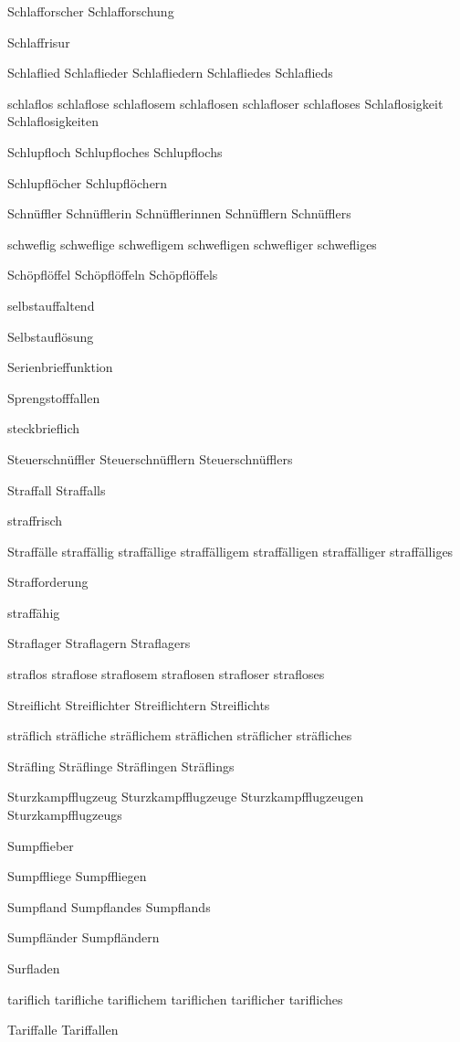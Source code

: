 Schlafforscher Schlafforschung

Schlaffrisur 

Schlaflied Schlaflieder Schlafliedern Schlafliedes Schlaflieds

schlaflos schlaflose schlaflosem schlaflosen schlafloser schlafloses Schlaflosigkeit Schlaflosigkeiten

Schlupfloch Schlupfloches Schlupflochs

Schlupflöcher Schlupflöchern

Schnüffler Schnüfflerin Schnüfflerinnen Schnüfflern Schnüfflers

schweflig schweflige schwefligem schwefligen schwefliger schwefliges

Schöpflöffel Schöpflöffeln Schöpflöffels

selbstauffaltend

Selbstauflösung

Serienbrieffunktion

Sprengstofffallen

steckbrieflich

Steuerschnüffler Steuerschnüfflern Steuerschnüfflers

Straffall Straffalls

straffrisch

Straffälle straffällig straffällige straffälligem straffälligen straffälliger straffälliges

Strafforderung

straffähig

Straflager Straflagern Straflagers

straflos straflose straflosem straflosen strafloser strafloses

Streiflicht Streiflichter Streiflichtern Streiflichts

sträflich sträfliche sträflichem sträflichen sträflicher sträfliches

Sträfling Sträflinge Sträflingen Sträflings

Sturzkampfflugzeug Sturzkampfflugzeuge Sturzkampfflugzeugen Sturzkampfflugzeugs

Sumpffieber

Sumpffliege Sumpffliegen

Sumpfland Sumpflandes Sumpflands

Sumpfländer Sumpfländern

Surfladen

tariflich tarifliche tariflichem tariflichen tariflicher tarifliches

Tariffalle Tariffallen

